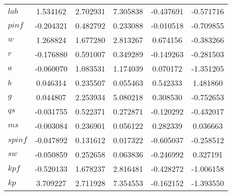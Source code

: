 \begin{center}
\begin{longtable}{lccccc}
$lab       $	 & 	        1.534162	 & 	        2.702931	 & 	        7.305838	 & 	       -0.437691	 & 	       -0.571716 \\ 
$pinf      $	 & 	       -0.204321	 & 	        0.482792	 & 	        0.233088	 & 	       -0.010518	 & 	       -0.709855 \\ 
$w         $	 & 	        1.268824	 & 	        1.677280	 & 	        2.813267	 & 	        0.674156	 & 	       -0.383266 \\ 
$r         $	 & 	       -0.176880	 & 	        0.591007	 & 	        0.349289	 & 	       -0.149263	 & 	       -0.281503 \\ 
$a         $	 & 	       -0.060070	 & 	        1.083531	 & 	        1.174039	 & 	        0.070172	 & 	       -1.351205 \\ 
$b         $	 & 	        0.046314	 & 	        0.235507	 & 	        0.055463	 & 	        0.542333	 & 	        1.481860 \\ 
$g         $	 & 	        0.044807	 & 	        2.253934	 & 	        5.080218	 & 	        0.308530	 & 	       -0.752653 \\ 
$qs        $	 & 	       -0.031755	 & 	        0.522371	 & 	        0.272871	 & 	       -0.120292	 & 	       -0.432017 \\ 
$ms        $	 & 	       -0.003084	 & 	        0.236901	 & 	        0.056122	 & 	        0.282339	 & 	        0.036663 \\ 
$spinf     $	 & 	       -0.047892	 & 	        0.131612	 & 	        0.017322	 & 	       -0.605037	 & 	       -0.258512 \\ 
$sw        $	 & 	       -0.050859	 & 	        0.252658	 & 	        0.063836	 & 	       -0.246992	 & 	        0.327191 \\ 
$kpf       $	 & 	       -0.520133	 & 	        1.678237	 & 	        2.816481	 & 	       -0.428272	 & 	       -1.006158 \\ 
$kp        $	 & 	        3.709227	 & 	        2.711928	 & 	        7.354553	 & 	       -0.162152	 & 	       -1.393550 \\ 
\end{longtable}
 \end{center}

